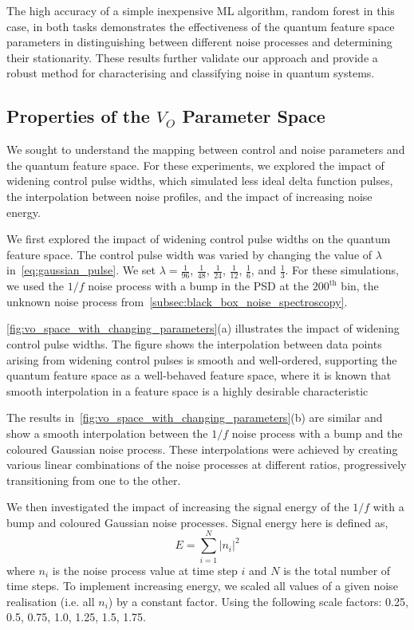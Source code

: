 \documentclass[12pt]{iopart}
\begin{document}
The high accuracy of a simple inexpensive ML algorithm, random forest in this case, in both tasks demonstrates the effectiveness of the quantum feature space parameters in distinguishing between different noise processes and determining their stationarity. These results further validate our approach and provide a robust method for characterising and classifying noise in quantum systems.

\subsection{Properties of the $V_O$ Parameter Space \label{subsec:properties_of_vo_parameter_space}}
We sought to understand the mapping between control and noise parameters and the quantum feature space. For these experiments, we explored the impact of widening control pulse widths, which simulated less ideal delta function pulses, the interpolation between noise profiles, and the impact of increasing noise energy.

We first explored the impact of widening control pulse widths on the quantum feature space. The control pulse width was varied by changing the value of $\lambda$ in~\cref{eq:gaussian_pulse}. We set $\lambda = \frac{1}{96}$, $\frac{1}{48}$, $\frac{1}{24}$, $\frac{1}{12}$, $\frac{1}{6}$, and $\frac{1}{3}$. For these simulations, we used the $1/f$ noise process with a bump in the PSD at the $200^\mathrm{th}$ bin, the unknown noise process from~\cref{subsec:black_box_noise_spectroscopy}.

\cref{fig:vo_space_with_changing_parameters}(a) illustrates the impact of widening control pulse widths. The figure shows the interpolation between data points arising from widening control pulses is smooth and well-ordered, supporting the quantum feature space as a well-behaved feature space, where it is known that smooth interpolation in a feature space is a highly desirable characteristic~\cite{123}

The results in~\cref{fig:vo_space_with_changing_parameters}(b) are similar and show a smooth interpolation between the $1/f$ noise process with a bump and the coloured Gaussian noise process. These interpolations were achieved by creating various linear combinations of the noise processes at different ratios, progressively transitioning from one to the other.

We then investigated the impact of increasing the signal energy of the $1/f$ with a bump and coloured Gaussian noise processes.  Signal energy here is defined as,
\begin{equation}
    \label{eq:signal_energy}
    E = \sum_{i=1}^{N} \left|n_i\right|^2
\end{equation}
where $n_i$ is the noise process value at time step $i$ and $N$ is the total number of time steps. To implement increasing energy, we scaled all values of a given noise realisation (i.e. all $n_i$) by a constant factor. Using the following scale factors: 0.25, 0.5, 0.75, 1.0, 1.25, 1.5, 1.75.
\end{document}
